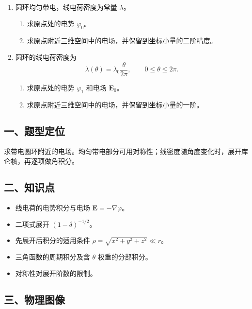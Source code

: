 \documentclass[12pt,a4paper,UTF8]{ctexart}
\newcommand{\tightlist}{\setlength{\itemsep}{0pt}\setlength{\parskip}{0pt}}
\begin{document}
\begin{enumerate}
\def\labelenumi{\arabic{enumi}.}
\tightlist
\item
  圆环均匀带电，线电荷密度为常量 \(\lambda\)。

  \begin{enumerate}
  \def\labelenumii{\arabic{enumii}.}
  \tightlist
  \item
    求原点处的电势 \(\varphi_0\)。
  \item
    求原点附近三维空间中的电场，并保留到坐标小量的二阶精度。
  \end{enumerate}
\item
  圆环的线电荷密度为
  \[\lambda(\theta)=\lambda_0\frac{\theta}{2\pi},\qquad 0\leq\theta\leq2\pi.\]

  \begin{enumerate}
  \def\labelenumii{\arabic{enumii}.}
  \tightlist
  \item
    求原点处的电势 \(\varphi_1\) 和电场 \(\boldsymbol E_0\)。
  \item
    求原点附近三维空间中的电场，并保留到坐标小量的一阶。
  \end{enumerate}
\end{enumerate}

\subsection{一、题型定位}\label{ux4e00ux9898ux578bux5b9aux4f4d-2}

求带电圆环附近的电场。均匀带电部分可用对称性；线密度随角度变化时，展开库仑核，再逐项做角积分。

\subsection{二、知识点}\label{ux4e8cux77e5ux8bc6ux70b9-2}

\begin{itemize}
\tightlist
\item
  线电荷的电势积分与电场 \(\boldsymbol E=-\nabla\varphi\)。
\item
  二项式展开 \((1-\delta)^{-1/2}\)。
\item
  先展开后积分的适用条件 \(\rho=\sqrt{x^2+y^2+z^2}\ll r\)。
\item
  三角函数的周期积分及含 \(\theta\) 权重的分部积分。
\item
  对称性对展开阶数的限制。
\end{itemize}

\subsection{三、物理图像}\label{ux4e09ux7269ux7406ux56feux50cf-2}
\end{document}
